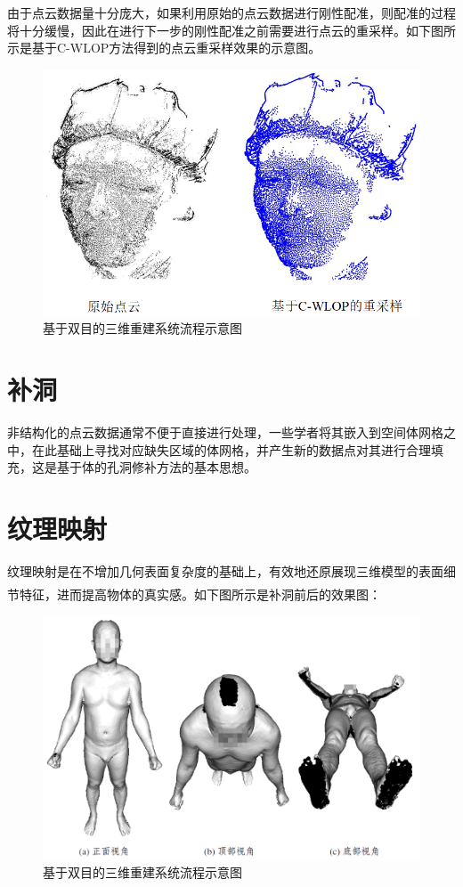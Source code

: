 \documentclass[10pt]{article}
\newcommand{\upcite}[1]{\textsuperscript{\textsuperscript{\cite{#1}}}}
\begin{document}
由于点云数据量十分庞大，如果利用原始的点云数据进行刚性配准，则配准的过程将十分缓慢，因此在进行下一步的刚性配准之前需要进行点云的重采样。如下图所示是基于C-WLOP方法得到的点云重采样效果的示意图。
\begin{figure}[H]
\begin{center}
\includegraphics[scale=0.25]{point-cloud-resampling.png}
\caption{基于双目的三维重建系统流程示意图}
\end{center}
\end{figure}

\section{补洞}
非结构化的点云数据通常不便于直接进行处理，一些学者将其嵌入到空间体网格之中，在此基础上寻找对应缺失区域的体网格，并产生新的数据点对其进行合理填充，这是基于体的孔洞修补方法的基本思想。
\section{纹理映射}
纹理映射是在不增加几何表面复杂度的基础上，有效地还原展现三维模型的表面细节特征，进而提高物体的真实感\upcite{texture_mapping01}。如下图所示是补洞前后的效果图：
\begin{figure}[H]
\begin{center}
\includegraphics[scale=0.25]{filling-hole.png}
\caption{基于双目的三维重建系统流程示意图}
\end{center}
\end{figure}
\end{document}
